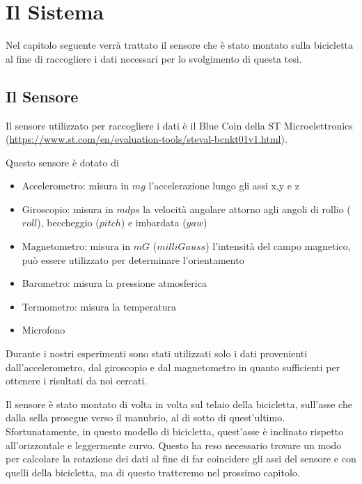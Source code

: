 \documentclass[class=article]{standalone}
\begin{document}
	\section{Il Sistema}
	Nel capitolo seguente verrà trattato il sensore che è stato montato sulla bicicletta al fine di raccogliere i dati necessari per lo svolgimento di questa tesi. 
	
	\subsection{Il Sensore}
	Il sensore utilizzato per raccogliere i dati è il Blue Coin della ST Microelettronics (\url{https://www.st.com/en/evaluation-tools/steval-bcnkt01v1.html}).
	
	Questo sensore è dotato di
	\begin{itemize}
		\item Accelerometro: misura in \(mg\) l'accelerazione lungo gli assi x,y e z
		\item Giroscopio: misura in \(mdps\) la velocità angolare attorno agli angoli di rollio (\(roll\)), beccheggio (\(pitch\)) e imbardata (\(yaw\))
		\item Magnetometro: misura in \(mG\) (\(milli Gauss\)) l'intensità del campo magnetico, può essere utilizzato per determinare l'orientamento
		\item Barometro: misura la pressione atmosferica
		\item Termometro: misura la temperatura
		\item Microfono
	\end{itemize}
	
	Durante i nostri esperimenti sono stati utilizzati solo i dati provenienti dall'accelerometro, dal giroscopio e dal magnetometro in quanto sufficienti per ottenere i risultati da noi cercati.
		
	Il sensore è stato montato di volta in volta sul telaio della bicicletta, sull'asse che dalla sella prosegue verso il manubrio, al di sotto di quest'ultimo. Sfortunatamente, in questo modello di bicicletta, quest'asse è inclinato rispetto all'orizzontale e leggermente curvo. Questo ha reso necessario trovare un modo per calcolare la rotazione dei dati al fine di far coincidere gli assi del sensore e con quelli della bicicletta, ma di questo tratteremo nel prossimo capitolo.\hfill\break
	
\end{document}
